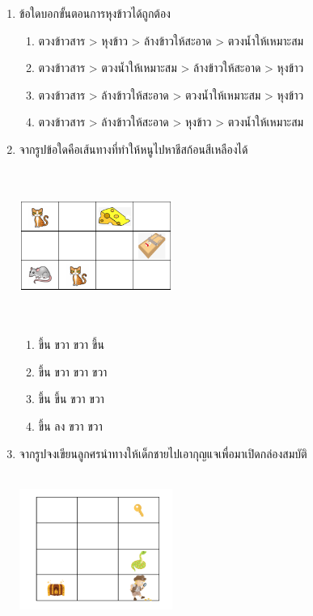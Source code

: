 \begin{enumerate}
    \item ข้อใดบอกขั้นตอนการหุงข้าวได้ถูกต้อง
    \begin{enumerate}
        \item ตวงข้าวสาร > หุงข้าว > ล้างข้าวให้สะอาด > ตวงน้ำให้เหมาะสม
        \item ตวงข้าวสาร > ตวงน้ำให้เหมาะสม > ล้างข้าวให้สะอาด > หุงข้าว
        \item ตวงข้าวสาร > ล้างข้าวให้สะอาด > ตวงน้ำให้เหมาะสม > หุงข้าว
        \item ตวงข้าวสาร > ล้างข้าวให้สะอาด > หุงข้าว > ตวงน้ำให้เหมาะสม
    \end{enumerate}
    \item จากรูปข้อใดคือเส้นทางที่ทำให้หนูไปหาชีสก้อนสีเหลืองได้
    \begin{center}
        \includegraphics[width=5cm, height=5cm]{pic-toro/exam/cat.png}
    \end{center}
    \begin{enumerate}
        \item ขึ้น ขวา ขวา ขึ้น
        \item ขึ้น ขวา ขวา ขวา
        \item ขึ้น ขึ้น ขวา ขวา
        \item ขึ้น ลง ขวา ขวา
    \end{enumerate}
    \item จากรูปจงเขียนลูกศรนำทางให้เด็กชายไปเอากุญแจเพื่อมาเปิดกล่องสมบัติ
    \begin{center}
        \includegraphics[width=5cm, height=5cm]{pic-toro/exam/treasure.png}

\end{center}
\end{enumerate}
